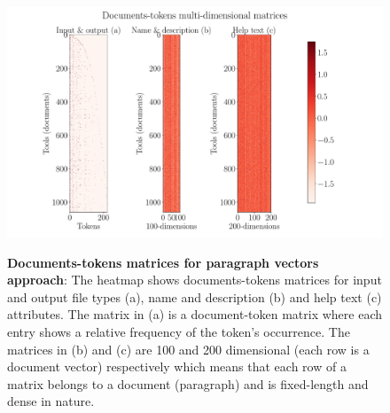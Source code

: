 \begin{figure}[h]
\begin{centering}
    {\includegraphics[scale=0.35]{figures/Documents-tokens_doc2vec.pdf}}
    \caption[Documents-tokens matrices for paragraph vectors]{\textbf{Documents-tokens matrices for paragraph vectors approach}: The heatmap shows documents-tokens matrices for input and output file types (a), name and description (b) and help text (c) attributes. The matrix in (a) is a document-token matrix where each entry shows a relative frequency of the token's occurrence. The matrices in (b) and (c) are 100 and 200 dimensional (each row is a document vector) respectively which means that each row of a matrix belongs to a document (paragraph) and is fixed-length and dense in nature. }
\end{centering}
\end{figure}

